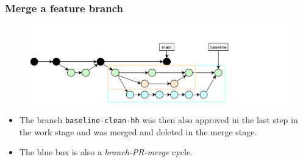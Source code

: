 \documentclass[aspectratio=169]{beamer}
\begin{document}
\begin{frame}
	\frametitle{Merge a feature branch}

	\vspace{-.5cm}
	\begin{minipage}[t][5cm][t]{\textwidth}
		\begin{figure}
			\centering
			\includegraphics[width=\textwidth]{./img/dime-gitflow-network-2-5.png}
		\end{figure}
	\end{minipage}

	\vspace{-.5cm}
	\begin{minipage}[t][5cm][t]{\textwidth}
		\begin{itemize}
			\setlength\itemsep{.5em}
			\item The branch \texttt{baseline-clean-hh} was then
			also approved in the last step in the work stage and
			was merged and deleted in the merge stage.
			\item The blue box is also a \textit{branch-PR-merge} cycle.
		\end{itemize}
	\end{minipage}
\end{frame}
\end{document}
